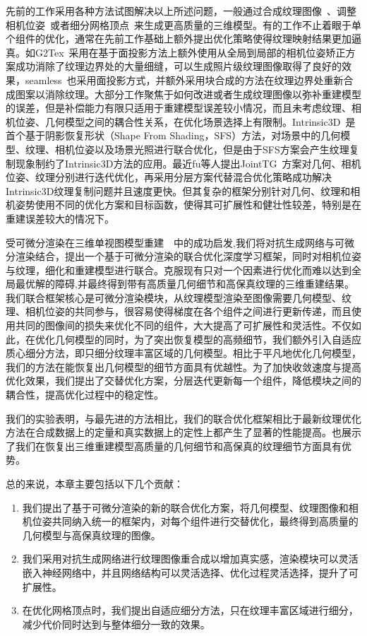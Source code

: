先前的工作采用各种方法试图解决以上所述问题，一般通过合成纹理图像~\cite{bi2017patch}、调整相机位姿~\cite{zhou2014color}或者细分网格顶点~\cite{ChengleiWu2014RealtimeSR}来生成更高质量的三维模型。有的工作不止着眼于单个组件的优化，通常在先前工作基础上额外提出优化策略使得纹理映射结果更加逼真。如G2Tex~\cite{fu2018texture}采用在基于面投影方法上额外使用从全局到局部的相机位姿矫正方案成功消除了纹理边界处的大量细缝，可以生成照片级纹理图像取得了良好的效果，seamless~\cite{fu2021seamless}也采用面投影方式，并额外采用块合成的方法在纹理边界处重新合成图案以消除纹理。大部分工作聚焦于如何改进或者生成纹理图像以弥补重建模型的误差，但是补偿能力有限只适用于重建模型误差较小情况，而且未考虑纹理、相机位姿、几何模型之间的耦合性关系，在优化场景选择上有限制。Intrinsic3D~\cite{RobertMaier2017Intrinsic3DH3}是首个基于阴影恢复形状（Shape From Shading，SFS）方法，对场景中的几何模型、纹理、相机位姿以及场景光照进行联合优化，但是由于SFS方案会产生纹理复制现象制约了Intrinsic3D方法的应用。最近fu等人提出JointTG~\cite{YanpingFu2020JointTA}方案对几何、相机位姿、纹理分别进行迭代优化，再采用分层方案代替混合优化策略成功解决Intrinsic3D纹理复制问题并且速度更快。但其复杂的框架分别针对几何、纹理和相机姿势使用不同的优化方案和目标函数，使得其可扩展性和健壮性较差，特别是在重建误差较大的情况下。\par


受可微分渲染在三维单视图模型重建~\cite{liu2020general}~\cite{ShichenLiu2019SoftRA}中的成功启发,我们将对抗生成网络与可微分渲染结合，提出一个基于可微分渲染的联合优化深度学习框架，同时对相机位姿与纹理，细化和重建模型进行联合。克服现有只对一个因素进行优化而难以达到全局最优解的障碍,并最终得到带有高质量几何细节和高保真纹理的三维重建结果。我们联合框架核心是可微分渲染模块，从纹理模型渲染至图像需要几何模型、纹理、相机位姿的共同参与，很容易使得梯度在各个组件之间进行更新传递，而且使用共同的图像间的损失来优化不同的组件，大大提高了可扩展性和灵活性。不仅如此，在优化几何模型的同时，为了突出恢复模型的高频细节，我们额外引入自适应质心细分方法，即只细分纹理丰富区域的几何模型。相比于平凡地优化几何模型，我们的方法在能恢复出几何模型的细节方面具有优越性。为了加快收敛速度与提高优化效果，我们提出了交替优化方案，分层迭代更新每一个组件，降低模块之间的耦合性，提高优化过程中的稳定性。\par

我们的实验表明，与最先进的方法相比，我们的联合优化框架相比于最新纹理优化方法在合成数据上的定量和真实数据上的定性上都产生了显著的性能提高。也展示了我们在恢复出三维重建模型高质量的几何细节和高保真的纹理细节方面具有优势。\par
总的来说，本章主要包括以下几个贡献：\par
\begin{enumerate}
\item 我们提出了基于可微分渲染的新的联合优化方案，将几何模型、纹理图像和相机位姿共同纳入统一的框架内，对每个组件进行交替优化，最终得到高质量的几何模型与高保真纹理的图像。
\item 我们采用对抗生成网络进行纹理图像重合成以增加真实感，渲染模块可以灵活嵌入神经网络中，并且网络结构可以灵活选择、优化过程灵活选择，提升了可扩展性。
\item 在优化网格顶点时，我们提出自适应细分方法，只在纹理丰富区域进行细分，减少代价同时达到与整体细分一致的效果。
\end{enumerate}


